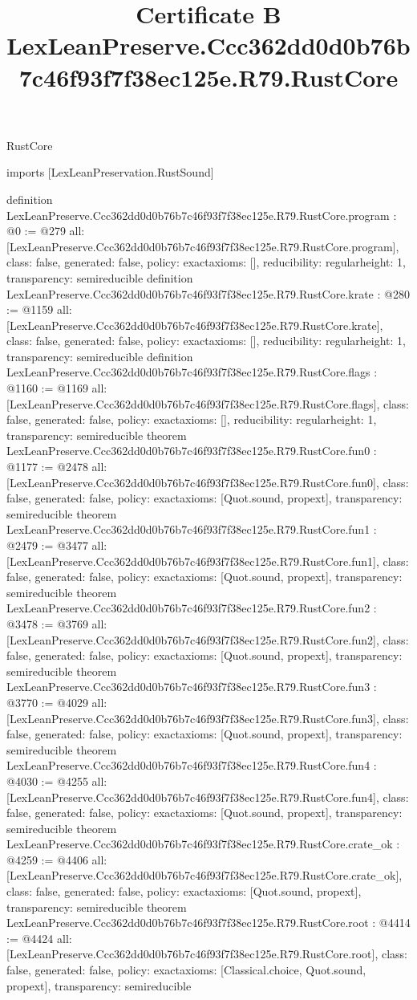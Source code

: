 \begin{lexlean}{RustCore}
\title{Certificate B LexLeanPreserve.Ccc362dd0d0b76b7c46f93f7f38ec125e.R79.RustCore}
\begin{coremodule}
imports [LexLeanPreservation.RustSound]

definition LexLeanPreserve.Ccc362dd0d0b76b7c46f93f7f38ec125e.R79.RustCore.program : @0 := @279 {
  all: [LexLeanPreserve.Ccc362dd0d0b76b7c46f93f7f38ec125e.R79.RustCore.program],
  class: false,
  generated: false,
  policy: exact{axioms: []},
  reducibility: regular{height: 1},
  transparency: semireducible
}
definition LexLeanPreserve.Ccc362dd0d0b76b7c46f93f7f38ec125e.R79.RustCore.krate : @280 := @1159 {
  all: [LexLeanPreserve.Ccc362dd0d0b76b7c46f93f7f38ec125e.R79.RustCore.krate],
  class: false,
  generated: false,
  policy: exact{axioms: []},
  reducibility: regular{height: 1},
  transparency: semireducible
}
definition LexLeanPreserve.Ccc362dd0d0b76b7c46f93f7f38ec125e.R79.RustCore.flags : @1160 := @1169 {
  all: [LexLeanPreserve.Ccc362dd0d0b76b7c46f93f7f38ec125e.R79.RustCore.flags],
  class: false,
  generated: false,
  policy: exact{axioms: []},
  reducibility: regular{height: 1},
  transparency: semireducible
}
theorem LexLeanPreserve.Ccc362dd0d0b76b7c46f93f7f38ec125e.R79.RustCore.fun0 : @1177 := @2478 {
  all: [LexLeanPreserve.Ccc362dd0d0b76b7c46f93f7f38ec125e.R79.RustCore.fun0],
  class: false,
  generated: false,
  policy: exact{axioms: [Quot.sound, propext]},
  transparency: semireducible
}
theorem LexLeanPreserve.Ccc362dd0d0b76b7c46f93f7f38ec125e.R79.RustCore.fun1 : @2479 := @3477 {
  all: [LexLeanPreserve.Ccc362dd0d0b76b7c46f93f7f38ec125e.R79.RustCore.fun1],
  class: false,
  generated: false,
  policy: exact{axioms: [Quot.sound, propext]},
  transparency: semireducible
}
theorem LexLeanPreserve.Ccc362dd0d0b76b7c46f93f7f38ec125e.R79.RustCore.fun2 : @3478 := @3769 {
  all: [LexLeanPreserve.Ccc362dd0d0b76b7c46f93f7f38ec125e.R79.RustCore.fun2],
  class: false,
  generated: false,
  policy: exact{axioms: [Quot.sound, propext]},
  transparency: semireducible
}
theorem LexLeanPreserve.Ccc362dd0d0b76b7c46f93f7f38ec125e.R79.RustCore.fun3 : @3770 := @4029 {
  all: [LexLeanPreserve.Ccc362dd0d0b76b7c46f93f7f38ec125e.R79.RustCore.fun3],
  class: false,
  generated: false,
  policy: exact{axioms: [Quot.sound, propext]},
  transparency: semireducible
}
theorem LexLeanPreserve.Ccc362dd0d0b76b7c46f93f7f38ec125e.R79.RustCore.fun4 : @4030 := @4255 {
  all: [LexLeanPreserve.Ccc362dd0d0b76b7c46f93f7f38ec125e.R79.RustCore.fun4],
  class: false,
  generated: false,
  policy: exact{axioms: [Quot.sound, propext]},
  transparency: semireducible
}
theorem LexLeanPreserve.Ccc362dd0d0b76b7c46f93f7f38ec125e.R79.RustCore.crate_ok : @4259 := @4406 {
  all: [LexLeanPreserve.Ccc362dd0d0b76b7c46f93f7f38ec125e.R79.RustCore.crate_ok],
  class: false,
  generated: false,
  policy: exact{axioms: [Quot.sound, propext]},
  transparency: semireducible
}
theorem LexLeanPreserve.Ccc362dd0d0b76b7c46f93f7f38ec125e.R79.RustCore.root : @4414 := @4424 {
  all: [LexLeanPreserve.Ccc362dd0d0b76b7c46f93f7f38ec125e.R79.RustCore.root],
  class: false,
  generated: false,
  policy: exact{axioms: [Classical.choice, Quot.sound, propext]},
  transparency: semireducible
}


\end{coremodule}
\end{lexlean}
